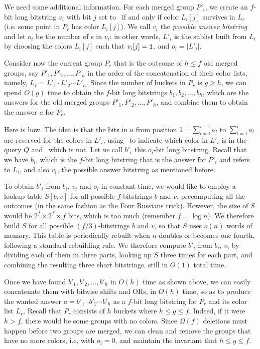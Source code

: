 We need some additional information. For each merged group $P'_i$, we create an $f$-bit long bitstring $v_i$ with bit $j$ set to \bitone\ if and only if color $L_i[j]$ survives in $L_r$ (i.e. some point in $P_r$ has color $L_i[j]$). We call $v_i$ the \emph{possible answer bitstring} and let $o_i$ be the number of {\bitone}s in $v_i$: in other words, $L'_i$ is the sublist built from $L_i$ by choosing the colors $L_i[j]$ such that $v_i[j] = \mathtt{1}$, and $o_i = |L'_i|$. 

Consider now the current group $P_r$ that is the outcome of $h \leq f$ old merged groups, say $P'_1, P'_2, \ldots, P'_h$ in the order of the concatenation of their color lists, namely, $L_r = L'_1 \cdot L'_2 \cdots L'_h$.  Since the number of buckets in $P_r$ is $g \geq h$, we can spend $O(g)$ time to obtain the $f$-bit long bitstrings $b_1, b_2, \ldots, b_h$, which are the answers for the old merged groups $P'_1, P'_2, \ldots, P'_h$, and combine them to obtain the answer $a$ for $P_r$. 

Here is how. The idea is that the bits in $a$ from position $1+\sum_{l=1}^{i-1} o_l$ to $\sum_{l=1}^i o_l$ are reserved for the colors in $L'_i$, using \bitone\ to indicate which color in $L'_i$ is in the query $Q$ and \bitzero\ which is not. Let us call $b'_i$ this $o_i$-bit long bitstring. Recall that we have $b_i$, which is the $f$-bit long bitstring that is the answer for $P'_i$ and refers to $L_i$, and also $v_i$, the possible answer bitstring as mentioned before.

To obtain $b'_i$ from $b_i$, $v_i$ and $o_i$ in constant time, we would like to employ a lookup table $S[b,v]$ for all possible $f$-bitstrings $b$ and $v$, precomputing all the outcomes (in the same fashion as the Four Russians trick). However, the size of $S$ would be $2^f \times 2^f \times f$ bits, which is too much (remember $f = \log n$). We therefore build $S$ for all possible $(f/3)$-bitstrings $b$ and $v$, so that $S$ uses $o(n)$ words of memory. This table is periodically rebuilt when $n$ doubles or becomes one fourth, following a standard rebuilding rule. We therefore compute $b'_i$ from $b_i$, $v_i$ by dividing each of them in three parts, looking up $S$ three times for each part, and combining the resulting three short bitstrings, still in $O(1)$ total time.

Once we have found $b'_1, b'_2, \ldots, b'_h$ in $O(h)$ time as shown above, we can easily concatenate them with bitwise shifts and ORs, in $O(h)$ time, so as to produce the wanted answer $a = b'_1 \cdot b'_2 \cdots b'_h$ as a $f$-bit long bitstring for $P_r$ and its color list $L_r$. Recall that $P_r$ consists of $h$ buckets where $h \leq g \leq f$. Indeed, if it were $h > f$, there would be some groups with no colors. Since $\Omega(f)$ deletions must happen before two groups are merged, we can clean and remove the groups that have no more colors, i.e, with $o_i = 0$, and maintain the invariant that $h \leq g \leq f$.

